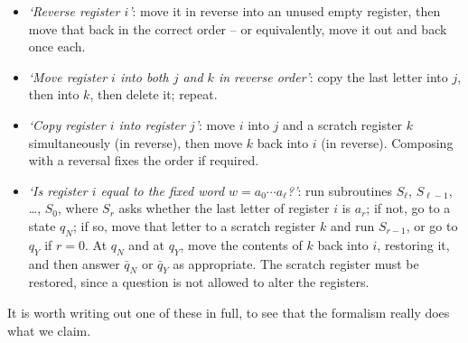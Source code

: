 \begin{itemize}
	\item \emph{`Reverse register $i$'}: move it in reverse into an unused empty register, then move that back in the correct order -- or equivalently, move it out and back once each.
	\item \emph{`Move register $i$ into both $j$ and $k$ in reverse order'}: copy the last letter into $j$, then into $k$, then delete it; repeat.
	\item \emph{`Copy register $i$ into register $j$'}: move $i$ into $j$ and a scratch register $k$ simultaneously (in reverse), then move $k$ back into $i$ (in reverse). Composing with a reversal fixes the order if required.
	\item \emph{`Is register $i$ equal to the fixed word $w = a_0\cdots a_\ell$?'}: run subroutines $S_\ell$, $S_{\ell-1}$, \dots, $S_0$, where $S_r$ asks whether the last letter of register $i$ is $a_r$; if not, go to a state $q_N$; if so, move that letter to a scratch register $k$ and run $S_{r-1}$, or go to $q_Y$ if $r = 0$. At $q_N$ and at $q_Y$, move the contents of $k$ back into $i$, restoring it, and then answer $\bar q_N$ or $\bar q_Y$ as appropriate. The scratch register must be restored, since a question is not allowed to alter the registers.
\end{itemize}

It is worth writing out one of these in full, to see that the formalism really does what we claim.


